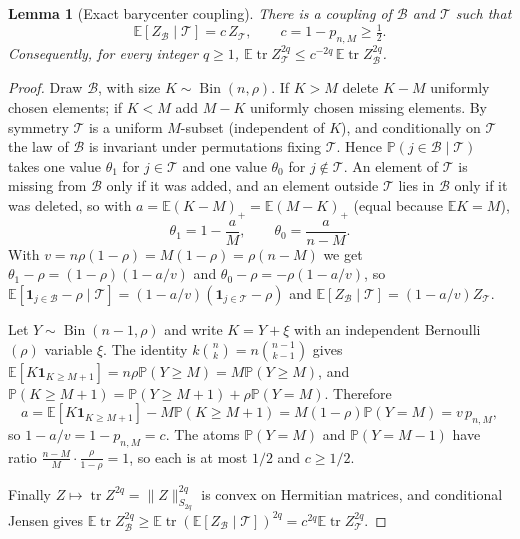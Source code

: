 \documentclass[11pt,a4paper]{article}
\newtheorem{lemma}[theorem]{Lemma}
\theoremstyle{definition}
\theoremstyle{remark}
\numberwithin{equation}{section}
\newcommand{\E}{\mathbb E}
\newcommand{\Prob}{\mathbb P}
\newcommand{\tr}{\operatorname{tr}}
\newcommand{\Bin}{\operatorname{Bin}}
\newcommand{\norm}[1]{\lVert#1\rVert}
\newcommand{\cT}{\mathcal T}
\begin{document}
\begin{lemma}[Exact barycenter coupling]\label{lem:coupling}
There is a coupling of $\mathcal B$ and $\cT$ such that
\[
 \E[Z_{\mathcal B}\mid\cT]=c\,Z_\cT,\qquad c=1-p_{n,M}\ge\tfrac12 .
\]
Consequently, for every integer $q\ge1$,
$\E\tr Z_\cT^{2q}\le c^{-2q}\,\E\tr Z_{\mathcal B}^{2q}$.
\end{lemma}
\begin{proof}
Draw $\mathcal B$, with size $K\sim\Bin(n,\rho)$. If $K>M$ delete $K-M$
uniformly chosen elements; if $K<M$ add $M-K$ uniformly chosen missing
elements. By symmetry $\cT$ is a uniform $M$-subset (independent of $K$), and
conditionally on $\cT$ the law of $\mathcal B$ is invariant under
permutations fixing $\cT$. Hence $\Prob(j\in\mathcal B\mid\cT)$ takes one
value $\theta_1$ for $j\in\cT$ and one value $\theta_0$ for $j\notin\cT$. An
element of $\cT$ is missing from $\mathcal B$ only if it was added, and an
element outside $\cT$ lies in $\mathcal B$ only if it was deleted, so with
$a=\E(K-M)_+=\E(M-K)_+$ (equal because $\E K=M$),
\[
 \theta_1=1-\frac aM,\qquad\theta_0=\frac a{n-M}.
\]
With $v=n\rho(1-\rho)=M(1-\rho)=\rho(n-M)$ we get
$\theta_1-\rho=(1-\rho)(1-a/v)$ and $\theta_0-\rho=-\rho(1-a/v)$, so
$\E[\mathbf 1_{j\in\mathcal B}-\rho\mid\cT]=(1-a/v)(\mathbf 1_{j\in\cT}-\rho)$
and $\E[Z_{\mathcal B}\mid\cT]=(1-a/v)Z_\cT$.

Let $Y\sim\Bin(n-1,\rho)$ and write $K=Y+\xi$ with an independent
Bernoulli$(\rho)$ variable $\xi$. The identity $k\binom nk=n\binom{n-1}{k-1}$
gives $\E[K\mathbf 1_{K\ge M+1}]=n\rho\Prob(Y\ge M)=M\Prob(Y\ge M)$, and
$\Prob(K\ge M+1)=\Prob(Y\ge M+1)+\rho\Prob(Y=M)$. Therefore
\[
 a=\E[K\mathbf 1_{K\ge M+1}]-M\Prob(K\ge M+1)=M(1-\rho)\Prob(Y=M)=v\,p_{n,M},
\]
so $1-a/v=1-p_{n,M}=c$. The atoms $\Prob(Y=M)$ and $\Prob(Y=M-1)$ have ratio
$\frac{n-M}{M}\cdot\frac\rho{1-\rho}=1$, so each is at most $1/2$ and
$c\ge1/2$.

Finally $Z\mapsto\tr Z^{2q}=\norm Z_{S_{2q}}^{2q}$ is convex on Hermitian
matrices, and conditional Jensen gives
$\E\tr Z_{\mathcal B}^{2q}\ge\E\tr(\E[Z_{\mathcal B}\mid\cT])^{2q}
=c^{2q}\E\tr Z_\cT^{2q}$.
\end{proof}
\end{document}
